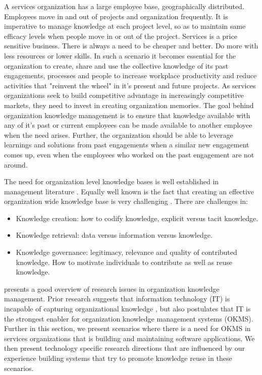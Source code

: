 A services organization has a large employee base, geographically distributed. Employees move in and out of projects and organization frequently. It is imperative to manage knowledge at each project level, so as to maintain same efficacy levels when people move in or out of the project. 
Services is a price sensitive business. There is always a need to be cheaper and better. Do more with less resources or lower skills. In such a scenario it becomes essential for the organization to create, share and use the collective knowledge of its past engagements, processes and people to increase workplace productivity and reduce activities that "reinvent the wheel" in it's present and future projects. As services organizations seek to build competitive advantage in increasingly competitive markets, they need to invest in creating organization memories.
The goal behind organization knowledge management is to ensure that knowledge available with any of it's past or current employees can be made available to another employee when the need arises. Further, the organization should be able to leverage learnings and solutions from past engagements when a similar new engagement comes up, even when the employees who worked on the past engagement are not around.

The need for organization level knowledge bases is well established in management literature \cite{}. Equally well known is the fact that creating an effective organization wide knowledge base is very challenging \cite{}. There are challenges in:
\begin{itemize}
\item Knowledge creation: how to codify knowledge, explicit versus tacit knowledge.
\item Knowledge retrieval: data versus information versus knowledge.
\item Knowledge governance: legitimacy, relevance and quality of contributed knowledge. How to motivate individuals to contribute as well as reuse knowledge.
\end{itemize}

\cite{} presents a good overview of research issues in organization knowledge management. Prior research suggests that information technology (IT) is incapable of capturing organizational knowledge \cite{}, but also postulates that IT is the strongest enabler for organization knowledge management systems (OKMS). Further in this section, we present scenarios where there is a need for OKMS in services organizations that is building and maintaining software applications. We then present technology specific research directions that are influenced by our experience building systems that try to promote knowledge reuse in these scenarios. 

